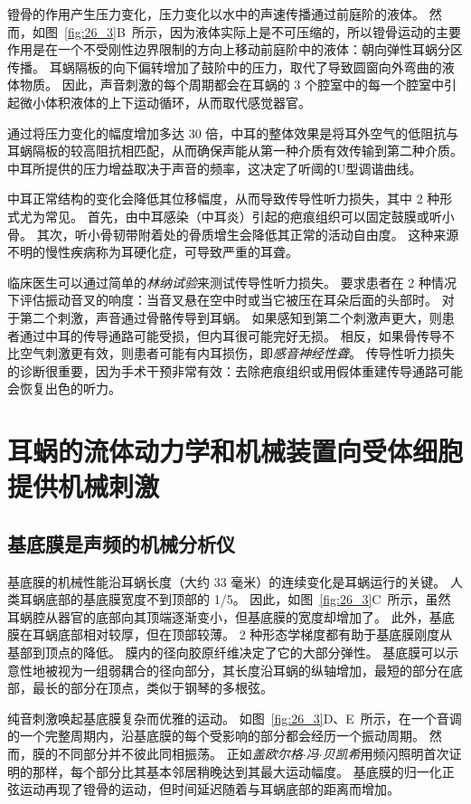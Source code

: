 镫骨的作用产生压力变化，压力变化以水中的声速传播通过前庭阶的液体。
然而，如图~\ref{fig:26_3}B~所示，因为液体实际上是不可压缩的，所以镫骨运动的主要作用是在一个不受刚性边界限制的方向上移动前庭阶中的液体：朝向弹性耳蜗分区传播。
耳蜗隔板的向下偏转增加了鼓阶中的压力，取代了导致圆窗向外弯曲的液体物质。
因此，声音刺激的每个周期都会在耳蜗的 3 个腔室中的每一个腔室中引起微小体积液体的上下运动循环，从而取代感觉器官。


通过将压力变化的幅度增加多达 30 倍，中耳的整体效果是将耳外空气的低阻抗与耳蜗隔板的较高阻抗相匹配，从而确保声能从第一种介质有效传输到第二种介质。
中耳所提供的压力增益取决于声音的频率，这决定了听阈的U型调谐曲线。


中耳正常结构的变化会降低其位移幅度，从而导致传导性听力损失，其中 2 种形式尤为常见。
首先，由中耳感染（中耳炎）引起的疤痕组织可以固定鼓膜或听小骨。
其次，听小骨韧带附着处的骨质增生会降低其正常的活动自由度。
这种来源不明的慢性疾病称为耳硬化症，可导致严重的耳聋。


临床医生可以通过简单的\textit{林纳试验}来测试传导性听力损失。
要求患者在 2 种情况下评估振动音叉的响度：当音叉悬在空中时或当它被压在耳朵后面的头部时。
对于第二个刺激，声音通过骨骼传导到耳蜗。
如果感知到第二个刺激声更大，则患者通过中耳的传导通路可能受损，但内耳很可能完好无损。
相反，如果骨传导不比空气刺激更有效，则患者可能有内耳损伤，即\textit{感音神经性聋}。
传导性听力损失的诊断很重要，因为手术干预非常有效：去除疤痕组织或用假体重建传导通路可能会恢复出色的听力。



\section{耳蜗的流体动力学和机械装置向受体细胞提供机械刺激}

\subsection{基底膜是声频的机械分析仪}

基底膜的机械性能沿耳蜗长度（大约 33 毫米）的连续变化是耳蜗运行的关键。
人类耳蜗底部的基底膜宽度不到顶部的 1/5。
因此，如图~\ref{fig:26_3}C~所示，虽然耳蜗腔从器官的底部向其顶端逐渐变小，但基底膜的宽度却增加了。
此外，基底膜在耳蜗底部相对较厚，但在顶部较薄。
2 种形态学梯度都有助于基底膜刚度从基部到顶点的降低。
膜内的径向胶原纤维决定了它的大部分弹性。
基底膜可以示意性地被视为一组弱耦合的径向部分，其长度沿耳蜗的纵轴增加，最短的部分在底部，最长的部分在顶点，类似于钢琴的多根弦。


纯音刺激唤起基底膜复杂而优雅的运动。
如图~\ref{fig:26_3}D、E~所示，在一个音调的一个完整周期内，沿基底膜的每个受影响的部分都会经历一个振动周期。
然而，膜的不同部分并不彼此同相振荡。
正如\textit{盖欧尔格$\cdot$冯$\cdot$贝凯希}用频闪照明首次证明的那样，每个部分比其基本邻居稍晚达到其最大运动幅度\cite{von1960experiments}。
基底膜的归一化正弦运动再现了镫骨的运动，但时间延迟随着与耳蜗底部的距离而增加。


